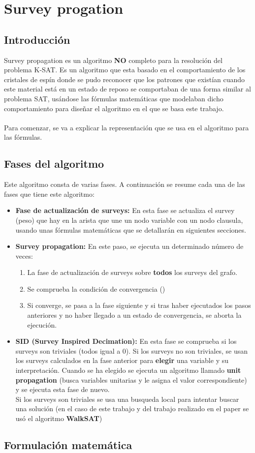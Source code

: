 \section{Survey progation}
\subsection{Introducción}
Survey propagation es un algoritmo \textbf{NO} completo para la resolución del problema K-SAT.
Es un algoritmo que esta basado en el comportamiento de los cristales de espín donde se pudo reconocer que los patrones que existían cuando este material está en un estado de reposo se comportaban de una forma similar al problema SAT, usándose las fórmulas matemáticas que modelaban dicho comportamiento para diseñar el algoritmo en el que se basa este trabajo.\\\\
Para comenzar, se va a explicar la representación que se usa en el algoritmo para las fórmulas. 

\subsection{Fases del algoritmo}
Este algoritmo consta de varias fases.
A continuación se resume cada una de las fases que tiene este algoritmo:
\begin{itemize}
	\item \textbf{Fase de actualización de surveys:} En esta fase se actualiza el survey (peso) que hay en la arista que une un nodo variable con un nodo clausula, usando unas fórmulas matemáticas que se detallarán en siguientes secciones.
	\item \textbf{Survey propagation:} En este paso, se ejecuta un determinado número de veces:
	\begin{enumerate}
		\item La fase de actualización de surveys sobre \textbf{todos} los surveys del grafo.
		\item Se comprueba la condición de convergencia ()
		\item Si converge, se pasa a la fase siguiente y si tras haber ejecutados los pasos anteriores y no haber llegado a un estado de convergencia, se aborta la ejecución.
	\end{enumerate} 
	\item \textbf{SID (Survey Inspired Decimation):} En esta fase se comprueba si los surveys son triviales (todos igual a 0). Si los surveys no son triviales, se usan los surveys calculados en la fase anterior para \textbf{elegir} una variable y su interpretación. Cuando se ha elegido se ejecuta un algoritmo llamado \textbf{unit propagation} (busca variables unitarias y le asigna el valor correspondiente) y se ejecuta esta fase de nuevo.\\
	Si los surveys son triviales se usa una busqueda local para intentar buscar una solución (en el caso de este trabajo y del trabajo realizado en el paper se usó el algoritmo \textbf{WalkSAT})
\end{itemize}
\subsection{Formulación matemática}


